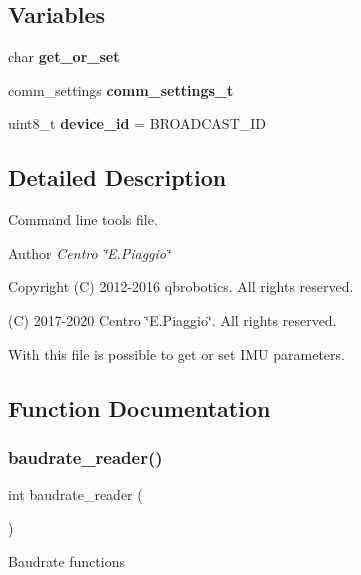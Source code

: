 \subsection*{Variables}
\begin{DoxyCompactItemize}
\item 
\mbox{\label{nmmi__param__imu_8c_a3c28322a1b5922f8c61d7cb3723b56b1}} 
char {\bfseries get\+\_\+or\+\_\+set}
\item 
\mbox{\label{nmmi__param__imu_8c_a92153f4b70cd8ba4e9b502ccff8d28bf}} 
comm\+\_\+settings {\bfseries comm\+\_\+settings\+\_\+t}
\item 
\mbox{\label{nmmi__param__imu_8c_aebf6cf4331fcc15f0d3ed0890e01a380}} 
uint8\+\_\+t {\bfseries device\+\_\+id} = B\+R\+O\+A\+D\+C\+A\+S\+T\+\_\+\+ID
\end{DoxyCompactItemize}


\subsection{Detailed Description}
Command line tools file. 

\begin{DoxyAuthor}{Author}
{\itshape Centro \char`\"{}\+E.\+Piaggio\char`\"{}} 
\end{DoxyAuthor}
\begin{DoxyCopyright}{Copyright}
(C) 2012-\/2016 qbrobotics. All rights reserved. 

(C) 2017-\/2020 Centro \char`\"{}\+E.\+Piaggio\char`\"{}. All rights reserved.
\end{DoxyCopyright}
With this file is possible to get or set I\+MU parameters. 

\subsection{Function Documentation}
\mbox{\label{nmmi__param__imu_8c_a872d84bb02f7d8f4617246f0c6d37c43}} 
\subsubsection{baudrate\+\_\+reader()}
{\footnotesize\ttfamily int baudrate\+\_\+reader (\begin{DoxyParamCaption}{ }\end{DoxyParamCaption})}

Baudrate functions 